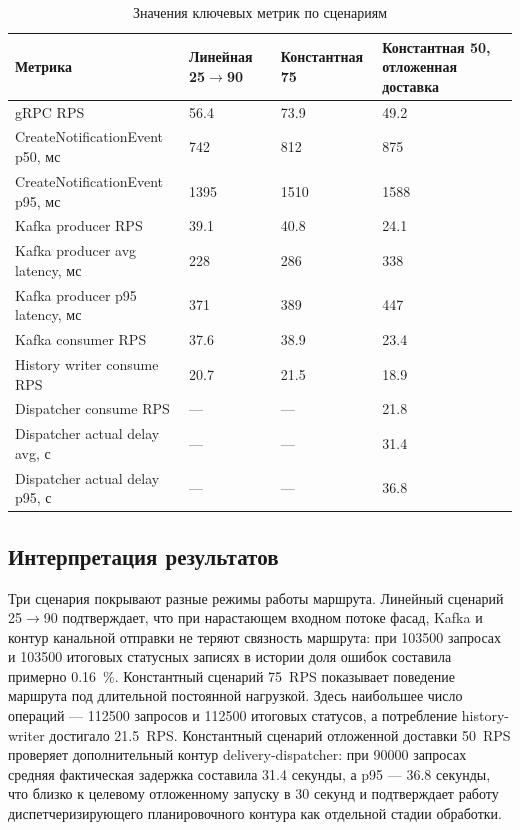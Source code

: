 \begin{table}[H]
    \centering
    \small
    \renewcommand{\arraystretch}{1.15}
    \caption{Значения ключевых метрик по сценариям}
    \label{tab:load-results-latency}
    \begin{tabular}{|L{0.34\textwidth}|L{0.16\textwidth}|L{0.16\textwidth}|L{0.18\textwidth}|}
        \hline
        \textbf{Метрика} & \textbf{Линейная 25$\rightarrow$90} & \textbf{Константная 75} & \textbf{Константная 50, отложенная доставка} \\
        \hline
        gRPC RPS & 56.4 & 73.9 & 49.2 \\
        \hline
        CreateNotificationEvent p50, мс & 742 & 812 & 875 \\
        \hline
        CreateNotificationEvent p95, мс & 1395 & 1510 & 1588 \\
        \hline
        Kafka producer RPS & 39.1 & 40.8 & 24.1 \\
        \hline
        Kafka producer avg latency, мс & 228 & 286 & 338 \\
        \hline
        Kafka producer p95 latency, мс & 371 & 389 & 447 \\
        \hline
        Kafka consumer RPS & 37.6 & 38.9 & 23.4 \\
        \hline
        History writer consume RPS & 20.7 & 21.5 & 18.9 \\
        \hline
        Dispatcher consume RPS & --- & --- & 21.8 \\
        \hline
        Dispatcher actual delay avg, с & --- & --- & 31.4 \\
        \hline
        Dispatcher actual delay p95, с & --- & --- & 36.8 \\
        \hline
    \end{tabular}
\end{table}

\subsection{Интерпретация результатов}

Три сценария покрывают разные режимы работы маршрута. Линейный сценарий 25$\rightarrow$90 подтверждает, что при нарастающем входном потоке фасад, Kafka и контур канальной отправки не теряют связность маршрута: при 103500 запросах и 103500 итоговых статусных записях в истории доля ошибок составила примерно 0.16~\%. Константный сценарий 75~RPS показывает поведение маршрута под длительной постоянной нагрузкой. Здесь наибольшее число операций --- 112500 запросов и 112500 итоговых статусов, а потребление history-writer достигало 21.5~RPS. Константный сценарий отложенной доставки 50~RPS проверяет дополнительный контур delivery-dispatcher: при 90000 запросах средняя фактическая задержка составила 31.4 секунды, а p95 --- 36.8 секунды, что близко к целевому отложенному запуску в 30 секунд и подтверждает работу диспетчеризирующего планировочного контура как отдельной стадии обработки.


